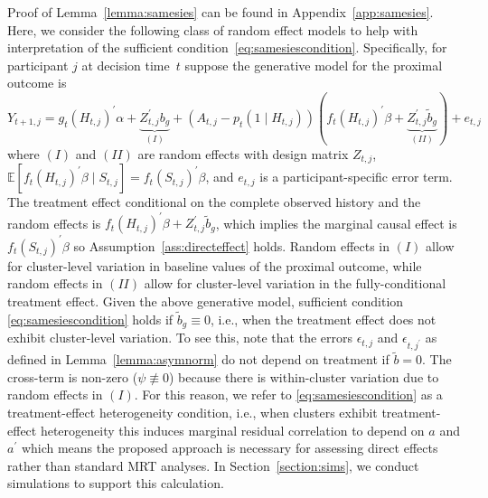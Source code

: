 \documentclass[12pt]{article}
\def\E{\mathbb{E}}
\begin{document}
Proof of Lemma~\ref{lemma:samesies} can be found in Appendix~\ref{app:samesies}. Here, we consider the following class of random effect models to help with interpretation of the sufficient condition~\eqref{eq:samesiescondition}.  Specifically, for participant $j$ at decision time~$t$ suppose the generative model for the proximal outcome is
$$
Y_{t+1,j} = g_t(H_{t,j})^\prime \alpha + \underbrace{Z_{t,j}^\prime b_g}_{(I)} + (A_{t,j} - p_t(1 \mid H_{t,j})) (f_t( H_{t,j})^\prime \beta + \underbrace{Z_{t,j}^\prime \tilde b_g}_{(II)}) + e_{t,j}
$$
where $(I)$ and $(II)$ are random effects with \textbf{}design matrix $Z_{t,j}$, $\E[ f_t(H_{t,j})^\prime \beta \mid S_{t,j} ] = f_t(S_{t,j})^\prime \beta$, and $e_{t,j}$ is a participant-specific error term.  The treatment effect conditional on the complete observed history and the random effects is $f_t( H_{t,j})^\prime \beta + Z_{t,j}^\prime \tilde b_g$, which implies  the marginal causal effect is $f_t (S_{t,j})^\prime \beta$ so Assumption~\ref{ass:directeffect} holds.  Random effects in $(I)$ allow for cluster-level variation in baseline values of the proximal outcome, while random effects in $(II)$ allow for cluster-level variation in the fully-conditional treatment effect. Given the above generative model, sufficient condition \eqref{eq:samesiescondition} holds if $\tilde b_g \equiv 0$, i.e., when the treatment effect does not exhibit cluster-level variation. To see this, note that the errors $\epsilon_{t,j}$ and $\epsilon_{t,j^\prime}$ as defined in Lemma~\ref{lemma:asymnorm} do not depend on treatment if $\tilde b = 0$.  The cross-term is non-zero ($\psi \not \equiv 0$) because there is within-cluster variation due to random effects in $(I)$.  For this reason, we refer to \eqref{eq:samesiescondition} as a treatment-effect heterogeneity condition, i.e., when clusters exhibit treatment-effect heterogeneity this induces marginal residual correlation to depend on $a$ and $a^\prime$ which means the proposed approach is necessary for assessing direct effects rather than standard MRT analyses. In Section~\ref{section:sims}, we conduct simulations to support this calculation.

\end{document}
